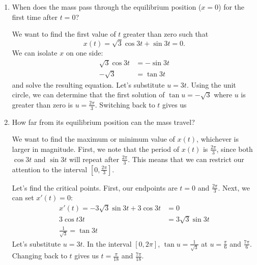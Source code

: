 \documentclass[main]{subfiles}
\begin{document}
\begin{enumerate}
\begin{enumerate}
    \item
      \begin{problem}[\vfill]
        When does the mass pass through the equilibrium position ($x=0$) for
        the first time after $t = 0$?
      \end{problem}

      \begin{solution}

        We want to find the first value of $t$ greater than zero such that
        \[
          x(t) = \sqrt{3}\cos 3t + \sin 3t = 0.
        \]
        We can isolate $x$ on one side:
        \begin{align*}
          \sqrt{3}\cos 3t &= -\sin 3t \\
          -\sqrt{3} &= \tan 3t
        \end{align*}
        and solve the resulting equation. Let's substitute $u=3t$. Using
        the unit circle, we can determine that the
        first solution of $\tan u = -\sqrt{3}$ where $u$ is greater
        than zero is $u = \frac{2 \pi}{3}$. Switching back to $t$ gives us
      \end{solution}

    \item
      \begin{problem}[\vfill]
        How far from its equilibrium position can the mass travel?
      \end{problem}

      \begin{solution}
        We want to find the maximum or minimum value of $x(t)$, whichever
        is larger in magnitude. First, we note that the period of $x(t)$
        is $\frac{2\pi}{3}$, since both $\cos 3t$ and $\sin 3t$ will repeat
        after $\frac{2\pi}{3}$. This means that we can restrict our
        attention to the interval $[0,\frac{2\pi}{3}]$. 

        Let's find the critical points. First, our endpoints are
        $t=0$ and $\frac{2\pi}{3}$. Next, we can set $x'(t)=0$:
        \begin{align*}
            x'(t) = -3\sqrt3 \sin 3t + 3 \cos 3t &= 0 \\
            3 \cos t 3t &= 3\sqrt3 \sin 3t \\
            \frac{1}{\sqrt3} = \tan 3t
        \end{align*}
        Let's substitute $u=3t$. In the interval $[0,2\pi]$, $\tan u =
        \frac{1}{\sqrt{3}}$ at $u=\frac{\pi}{6}$ and $\frac{7\pi}{6}$.
        Changing back to $t$ gives us $t=\frac{\pi}{18}$ and
        $\frac{7\pi}{18}$.


\end{solution}
\end{enumerate}
\end{enumerate}
\end{document}
